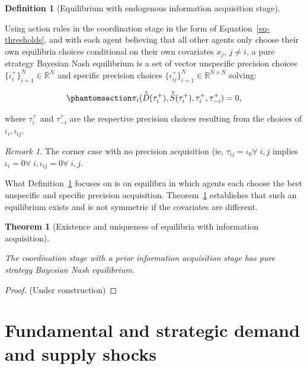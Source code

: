 \documentclass[
]{article}
\theoremstyle{plain}
\newtheorem{theorem}{Theorem}[section]
\theoremstyle{definition}
\newtheorem{definition}{Definition}[section]
\theoremstyle{remark}
\begin{document}
\begin{definition}[Equilibrium with endogenous information acquisition
stage]\protect\hypertarget{def-infoacquisition}{}\label{def-infoacquisition}

Using action rules in the coordination stage in the form of
Equation~\ref{eq-thresholds}, and with each agent believing that all
other agents only choose their own equilibria choices conditional on
their own covariates \(x_j\), \(j \neq i\), a pure strategy Bayesian
Nash equilibrium is a set of vector unspecific precision choices
\(\{\iota_i^{+}\}_{i=1}^N \in \mathbb{R}^N\) and specific precision
choices \(\{\iota_{ij}^{+}\}_{i=1}^N \in \mathbb{R}^{N \times N}\)
solving:

\begin{equation}\phantomsection\label{eq-BNE_infoacquis}{
\pi_i(\hat{\tilde{D}}(\tau_i^{+}), \hat{\tilde{S}}(\tau_i^{+}), \tau_i^{+}, \tau_{-i}^{+}) = 0,
}\end{equation}

where \(\tau_{i}^{+}\) and \(\tau_{-i}^{+}\) are the respective
precision choices resulting from the choices of \(\iota_i, \iota_{ij}\).

\emph{Remark 1.} The corner case with no precision acquisition (ie,
\(\tau_{ij} = \iota_0 \forall \; i, j\) implies
\(\iota_i = 0 \forall \; i, \iota_{ij} = 0 \forall \; i, j\).

\end{definition}

What Definition~\ref{def-infoacquisition} focuses on is on equilibra in
which agents each choose the best unspecific and specific precision
acquisition. Theorem~\ref{thm-infoacquisition} establishes that such an
equilibrium exists and is not symmetric if the covariates are different.

\begin{theorem}[Existence and uniqueness of equilibria with information
acquisition]\protect\hypertarget{thm-infoacquisition}{}\label{thm-infoacquisition}

The coordination stage with a prior information acquisition stage has
pure strategy Bayesian Nash equilibrium.

\end{theorem}

\begin{proof}
(Under construction)
\end{proof}

\section{Fundamental and strategic demand and supply
shocks}\label{fundamental-and-strategic-demand-and-supply-shocks}
\end{document}
